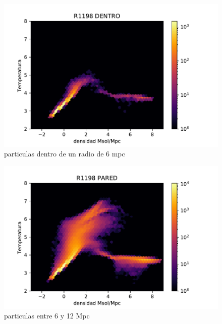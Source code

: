 \begin{figure}[h]
\centering
\includegraphics[width=18cm]{Figures/R1198_diagfase_int.pdf}
\decoRule
\caption[Diagrama de Fase R internas]{particulas dentro de un radio de 6 mpc}
\label{fig:Electron}
\end{figure}
\begin{figure}[h]
\centering
\includegraphics[width=18cm]{Figures/R1198_diagfase_wll.pdf}
\decoRule
\caption[Diagrama de Fase R pared]{particulas entre 6 y 12 Mpc}
\label{fig:Electron}
\end{figure}
